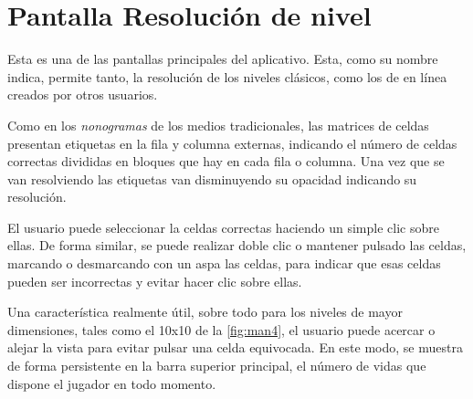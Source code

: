   \section{Pantalla Resolución de nivel}
  Esta es una de las pantallas principales del aplicativo. Esta, como
  su nombre indica, permite tanto, la resolución de los niveles clásicos, como
  los de en línea creados por otros usuarios. 
  
  Como en los \textit{nonogramas}
  de los medios tradicionales, las matrices de celdas presentan etiquetas en la fila y columna externas,
  indicando el número de celdas correctas divididas en bloques que hay en cada fila o columna.
  Una vez que se van resolviendo las etiquetas van disminuyendo su opacidad indicando su
  resolución.

  El usuario puede seleccionar la celdas correctas haciendo un simple clic sobre ellas.
  De forma similar, se puede realizar doble clic o mantener pulsado las celdas, marcando o desmarcando
  con un aspa las celdas, para indicar
  que esas celdas pueden ser incorrectas y evitar hacer clic sobre ellas.

  Una característica realmente útil, sobre todo para los niveles de mayor dimensiones, tales como el 10x10 de la \autoref{fig:man4},
  el usuario puede acercar o alejar la vista para evitar pulsar una
  celda equivocada. En este modo, se muestra de forma persistente en la barra superior principal, el número de
  vidas que dispone el jugador en todo momento.

